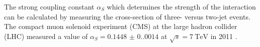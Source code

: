 \noindent
The strong coupling constant $\alpha_S$ which determines the strength of the interaction can be calculated by measuring the cross-section of three- versus two-jet events.
The compact muon solenoid experiment (CMS) at the large hadron collider (LHC) measured a value of $\alpha_S=\num{0.1448(0.0014)}$ at $\sqrt s=\SI{7}{\tera\eV}$ in 2011 \cite{CMS:2013vbb}.